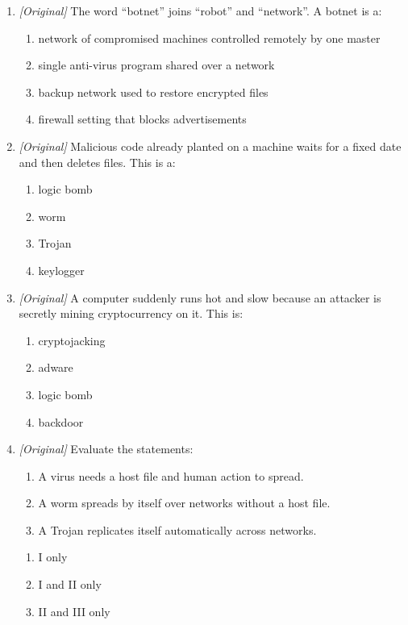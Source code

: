 \begin{enumerate}[label=\textbf{Q\arabic*.}, leftmargin=*]
\begin{enumerate}[label=\Alph*.]
  \end{enumerate}
\item \textit{[Original]} The word ``botnet'' joins ``robot'' and
  ``network''. A botnet is a:
  \begin{enumerate}[label=\Alph*.]
    \item network of compromised machines controlled remotely by one master
    \item single anti-virus program shared over a network
    \item backup network used to restore encrypted files
    \item firewall setting that blocks advertisements
  \end{enumerate}
\item \textit{[Original]} Malicious code already planted on a machine waits
  for a fixed date and then deletes files. This is a:
  \begin{enumerate}[label=\Alph*.]
    \item logic bomb
    \item worm
    \item Trojan
    \item keylogger
  \end{enumerate}
\item \textit{[Original]} A computer suddenly runs hot and slow because an
  attacker is secretly mining cryptocurrency on it. This is:
  \begin{enumerate}[label=\Alph*.]
    \item cryptojacking
    \item adware
    \item logic bomb
    \item backdoor
  \end{enumerate}
\item \textit{[Original]} Evaluate the statements:
  \begin{enumerate}[label=\Roman*.]
    \item A virus needs a host file and human action to spread.
    \item A worm spreads by itself over networks without a host file.
    \item A Trojan replicates itself automatically across networks.
  \end{enumerate}
  \begin{enumerate}[label=\Alph*.]
    \item I only
    \item I and II only
    \item II and III only

\end{enumerate}
\end{enumerate}
